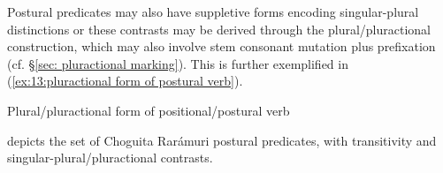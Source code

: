 Postural predicates may also have suppletive forms encoding singular-plural distinctions or these contrasts may be derived through the plural/pluractional construction, which may also involve stem consonant mutation plus prefixation (cf. §\ref{sec: pluractional marking}). This is further exemplified in (\ref{ex:13:pluractional form of postural verb}).

\newpage
\ea\label{ex:13:pluractional form of postural verb}
{Plural/pluractional form of positional/postural verb}

    \z
\z

 depicts the set of Choguita Rarámuri postural predicates, with transitivity and singular-plural/pluractional contrasts.


